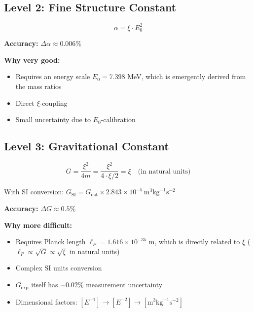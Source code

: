 	\subsection{Level 2: Fine Structure Constant}
	
	\begin{equation}
		\alpha = \xi \cdot E_0^2
	\end{equation}
	
	\begin{tcolorbox}[colback=blue!5!white,colframe=blue!75!black,title={Semi-pure $\xi$-Form}]
		\textbf{Accuracy:} $\Delta \alpha \approx 0.006\%$
		
		\textbf{Why very good:}
		\begin{itemize}
			\item Requires an energy scale $E_0 = 7.398$ MeV, which is emergently derived from the mass ratios
			\item Direct $\xi$-coupling
			\item Small uncertainty due to $E_0$-calibration
		\end{itemize}
	\end{tcolorbox}
	
	\subsection{Level 3: Gravitational Constant}
	
	\begin{equation}
		G = \frac{\xi^2}{4m} = \frac{\xi^2}{4 \cdot \xi/2} = \xi \quad \text{(in natural units)}
	\end{equation}
	
	With SI conversion: $G_{\text{SI}} = G_{\text{nat}} \times 2.843 \times 10^{-5}\,\text{m}^3\text{kg}^{-1}\text{s}^{-2}$
	
	\begin{tcolorbox}[colback=yellow!5!white,colframe=orange!75!black,title={Complex $\xi$-Form}]
		\textbf{Accuracy:} $\Delta G \approx 0.5\%$
		
		\textbf{Why more difficult:}
		\begin{itemize}
			\item Requires Planck length $\ell_P = 1.616 \times 10^{-35}$ m, which is directly related to $\xi$ ($\ell_P \propto \sqrt{G} \propto \sqrt{\xi}$ in natural units)
			\item Complex SI units conversion
			\item $G_{\exp}$ itself has $\sim 0.02\%$ measurement uncertainty
			\item Dimensional factors: $[E^{-1}] \to [E^{-2}] \to [\text{m}^3\text{kg}^{-1}\text{s}^{-2}]$
		\end{itemize}
	\end{tcolorbox}
	
